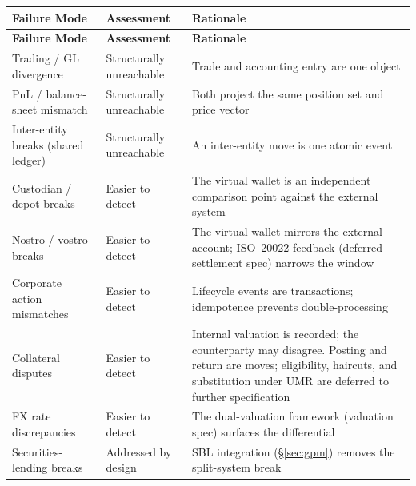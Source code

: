 \begin{center}
\begin{longtable}{p{4.3cm} p{3cm} p{5.7cm}}
\toprule
\textbf{Failure Mode} & \textbf{Assessment} & \textbf{Rationale} \\
\midrule
\endfirsthead
\toprule
\textbf{Failure Mode} & \textbf{Assessment} & \textbf{Rationale} \\
\midrule
\endhead
Trading / GL divergence & Structurally unreachable & Trade and accounting entry are one object \\
\midrule
PnL / balance-sheet mismatch & Structurally unreachable & Both project the same position set and price vector \\
\midrule
Inter-entity breaks (shared ledger) & Structurally unreachable & An inter-entity move is one atomic event \\
\midrule
Custodian / depot breaks & Easier to detect & The virtual wallet is an independent comparison point against the external system \\
\midrule
Nostro / vostro breaks & Easier to detect & The virtual wallet mirrors the external account; ISO~20022 feedback (deferred-settlement spec) narrows the window \\
\midrule
Corporate action mismatches & Easier to detect & Lifecycle events are transactions; idempotence prevents double-processing \\
\midrule
Collateral disputes & Easier to detect & Internal valuation is recorded; the counterparty may disagree. Posting and return are moves; eligibility, haircuts, and substitution under UMR are deferred to further specification \\
\midrule
FX rate discrepancies & Easier to detect & The dual-valuation framework (valuation spec) surfaces the differential \\
\midrule
Securities-lending breaks & Addressed by design & SBL integration (\S\ref{sec:gpm}) removes the split-system break \\
\bottomrule
\end{longtable}
\end{center}


